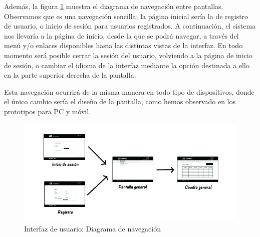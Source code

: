 Además, la figura \ref{fig:interfaz-navegacion} muestra el diagrama de navegación entre pantallas. Observamos que es una navegación sencilla; la página inicial sería la de registro de usuario, o inicio de sesión para usuarios registrados. A continuación, el sistema nos llevaría a la página de inicio, desde la que se podrá navegar, a través del menú y/o enlaces disponibles hasta las distintas vistas de la interfaz. En todo momento será posible cerrar la sesión del usuario, volviendo a la página de inicio de sesión, o cambiar el idioma de la interfaz mediante la opción destinada a ello en la parte superior derecha de la pantalla. 


Esta navegación ocurrirá de la misma manera en todo tipo de dispositivos, donde el único cambio sería el diseño de la pantalla, como hemos observado en los prototipos para PC y móvil.


\begin{figure}[H]
\centering
  \includegraphics[scale=.55]{img/interfaz/navegacion.jpg}
  \caption{Interfaz de usuario: Diagrama de navegación}
  \label{fig:interfaz-navegacion}
\end{figure}

